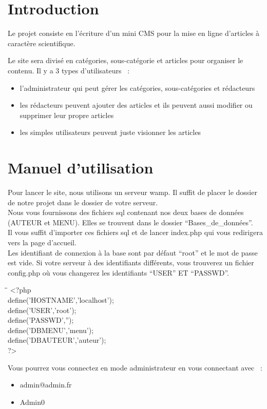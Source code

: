 \documentclass[hidelinks, 12pt,a4paper]{article}
\begin{document}
\newpage
\tableofcontents

\newpage
\section{Introduction}
Le projet consiste en l'écriture d'un mini CMS pour la mise en ligne d'articles à caractère scientifique.

Le site sera divisé en catégories, sous-catégorie et articles pour organiser le contenu.
Il y a 3 types d'utilisateurs ~:\\ 
\begin{itemize}
\item l'administrateur qui peut gérer les catégories, sous-catégories et rédacteurs
\item les rédacteurs peuvent ajouter des articles et ils peuvent aussi modifier ou supprimer leur propre articles 
\item les simples utilisateurs peuvent juste visionner les articles
\end{itemize}

\newpage
\section{Manuel d'utilisation}
Pour lancer le site, nous utilisons un serveur wamp. Il suffit de placer le dossier de notre projet dans le dossier de votre serveur.\\

Nous vous fournissons des fichiers sql contenant nos deux bases de données (AUTEUR et MENU). Elles se trouvent dans le dossier ``Bases\_de\_données''.\\

Il vous suffit d'importer ces fichiers sql et de lancer index.php qui vous redirigera vers la page d'accueil.\\

Les identifiant de connexion à la base sont par défaut ``root'' et le mot de passe est vide. Si votre serveur à des identifiants différents, vous trouverez un fichier config.php où vous changerez les identifiants ``USER'' ET ``PASSWD''.\\

\begin{tabbing}
\hspace{2cm}\=\hspace{2cm}\=\kill
<?php\\
\>	define('HOSTNAME','localhost');\\
\>	define('USER','root');\\
\>	define('PASSWD','');\\
\>	define('DBMENU','menu');\\
\>	define('DBAUTEUR','auteur');\\
?>\\
\end{tabbing} 
Vous pourrez vous connectez en mode administrateur en vous connectant avec ~:
\begin{itemize}
\item admin@admin.fr
\item Admin0\\
\end{itemize}
\end{document}
